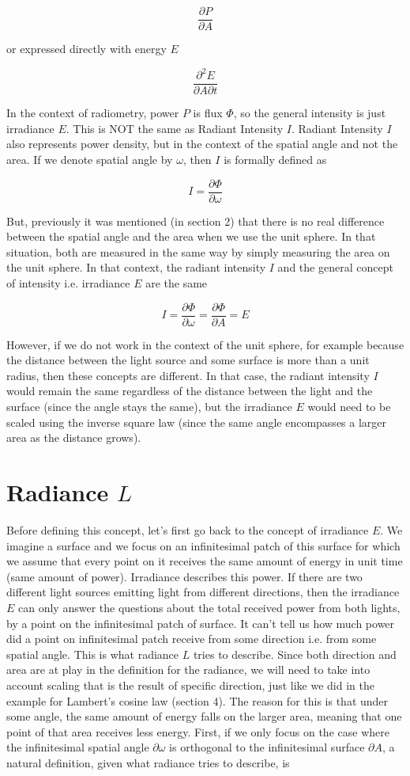 \documentclass{article}
\begin{document}
\[ \frac{\partial P}{\partial A} \]

or expressed directly with energy $E$

\[ \frac{\partial^2E}{\partial A \partial t} \]

In the context of radiometry, power $P$ is flux $\Phi$, so the general intensity is just irradiance $E$. This is NOT the same as Radiant Intensity $I$. Radiant Intensity $I$ also represents power density, but in the context of the spatial angle and not the area. If we denote spatial angle by $\omega$, then $I$ is formally defined as

\[ I = \frac{\partial \Phi}{\partial \omega} \]

But, previously it was mentioned (in section 2) that there is no real difference between the spatial angle and the area when we use the unit sphere. In that situation, both are measured in the same way by simply measuring the area on the unit sphere. In that context, the radiant intensity $I$ and the general concept of intensity i.e. irradiance $E$ are the same

\[ I = \frac{\partial \Phi}{\partial \omega} = \frac{\partial \Phi}{\partial A} = E \]

However, if we do not work in the context of the unit sphere, for example because the distance between the light source and some surface is more than a unit radius, then these concepts are different. In that case, the radiant intensity $I$ would remain the same regardless of the distance between the light and the surface (since the angle stays the same), but the irradiance $E$ would need to be scaled using the inverse square law (since the same angle encompasses a larger area as the distance grows).

\section{Radiance $L$}

Before defining this concept, let's first go back to the concept of irradiance $E$. We imagine a surface and we focus on an infinitesimal patch of this surface for which we assume that every point on it receives the same amount of energy in unit time (same amount of power). Irradiance describes this power. If there are two different light sources emitting light from different directions, then the irradiance $E$ can only answer the questions about the total received power from both lights, by a point on the infinitesimal patch of surface. It can't tell us how much power did a point on infinitesimal patch receive from some direction i.e. from some spatial angle. This is what radiance $L$ tries to describe. Since both direction and area are at play in the definition for the radiance, we will need to take into account scaling that is the result of specific direction, just like we did in the example for Lambert's cosine law (section 4). The reason for this is that under some angle, the same amount of energy falls on the larger area, meaning that one point of that area receives less energy. First, if we only focus on the case where the infinitesimal spatial angle $\partial \omega$ is orthogonal to the infinitesimal surface $\partial A$, a natural definition, given what radiance tries to describe, is
\end{document}
